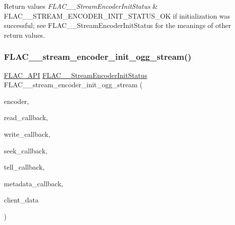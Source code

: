 \begin{DoxyRetVals}{Return values}
{\em F\+L\+A\+C\+\_\+\+\_\+\+Stream\+Encoder\+Init\+Status} & {\ttfamily F\+L\+A\+C\+\_\+\+\_\+\+S\+T\+R\+E\+A\+M\+\_\+\+E\+N\+C\+O\+D\+E\+R\+\_\+\+I\+N\+I\+T\+\_\+\+S\+T\+A\+T\+U\+S\+\_\+\+OK} if initialization was successful; see F\+L\+A\+C\+\_\+\+\_\+\+Stream\+Encoder\+Init\+Status for the meanings of other return values. \\
\hline
\end{DoxyRetVals}
\mbox{\label{group__flac__stream__encoder_ga87af71d74c09f7d482f9f420ef9bf826}} 
\subsubsection{\texorpdfstring{F\+L\+A\+C\+\_\+\+\_\+stream\+\_\+encoder\+\_\+init\+\_\+ogg\+\_\+stream()}{FLAC\_\_stream\_encoder\_init\_ogg\_stream()}}
{\footnotesize\ttfamily \hyperlink{group__flac__export_ga56ca07df8a23310707732b1c0007d6f5}{F\+L\+A\+C\+\_\+\+A\+PI} \hyperlink{group__flac__stream__encoder_ga3bb869620af2b188d77982a5c30b047d}{F\+L\+A\+C\+\_\+\+\_\+\+Stream\+Encoder\+Init\+Status} F\+L\+A\+C\+\_\+\+\_\+stream\+\_\+encoder\+\_\+init\+\_\+ogg\+\_\+stream (\begin{DoxyParamCaption}\item[{\hyperlink{struct_f_l_a_c_____stream_encoder}{F\+L\+A\+C\+\_\+\+\_\+\+Stream\+Encoder} $\ast$}]{encoder,  }\item[{\hyperlink{group__flac__stream__encoder_ga18b7941b93bae067192732e913536d44}{F\+L\+A\+C\+\_\+\+\_\+\+Stream\+Encoder\+Read\+Callback}}]{read\+\_\+callback,  }\item[{\hyperlink{group__flac__stream__encoder_ga50865125fd57c40fab6eb2f062651429}{F\+L\+A\+C\+\_\+\+\_\+\+Stream\+Encoder\+Write\+Callback}}]{write\+\_\+callback,  }\item[{\hyperlink{group__flac__stream__encoder_ga70b85349d5242e4401c4d8ddf6d9bbca}{F\+L\+A\+C\+\_\+\+\_\+\+Stream\+Encoder\+Seek\+Callback}}]{seek\+\_\+callback,  }\item[{\hyperlink{group__flac__stream__encoder_gabefdf2279e1d0347d9f98f46da4e415b}{F\+L\+A\+C\+\_\+\+\_\+\+Stream\+Encoder\+Tell\+Callback}}]{tell\+\_\+callback,  }\item[{\hyperlink{group__flac__stream__encoder_ga091fbf3340d85bcbda1090c31bc320cf}{F\+L\+A\+C\+\_\+\+\_\+\+Stream\+Encoder\+Metadata\+Callback}}]{metadata\+\_\+callback,  }\item[{\hyperlink{png_8h_ac9c84fa68bbad002983e35ce3663c686}{void} $\ast$}]{client\+\_\+data }\end{DoxyParamCaption})}

